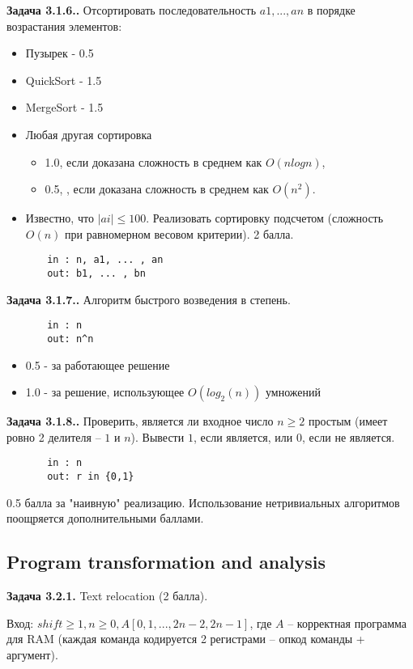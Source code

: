 \documentclass[a4paper, 10pt]{extarticle}
\newcommand{\Task}[1]{\textbf{Задача #1.}}
\begin{document}
\Task{3.1.6.} Отсортировать последовательность $a1, ..., an$ в порядке возрастания элементов:
\begin{itemize}
 \item Пузырек   - 0.5
 \item QuickSort - 1.5
 \item MergeSort - 1.5
 \item Любая другая сортировка 
 \begin{itemize}
  \item 1.0, если доказана сложность в среднем как $O(n log n)$, 
  \item 0.5, , если доказана сложность в среднем как $O(n^2)$. 
 \end{itemize}       
 \item Известно, что $|ai| \leq 100$. Реализовать сортировку подсчетом (сложность $O(n)$ при равномерном весовом критерии). 2 балла.
\end{itemize}
\begin{verbatim}
       in : n, a1, ... , an
       out: b1, ... , bn
\end{verbatim}

\Task{3.1.7.} Алгоритм быстрого возведения в степень.
\begin{verbatim}
       in : n
       out: n^n
\end{verbatim}
\begin{itemize}
  \item  0.5 - за работающее решение
  \item  1.0 - за решение, использующее $O(log_2(n))$ умножений
\end{itemize}
       
\Task{3.1.8.} Проверить, является ли входное число $n \geq 2$ простым (имеет ровно 2 делителя -- $1$ и $n$). 
Вывести $1$, если является, или $0$, если не является.
\begin{verbatim}
       in : n
       out: r in {0,1}
\end{verbatim}
0.5 балла за "наивную" реализацию. Использование нетривиальных алгоритмов поощряется дополнительными баллами.
    
\subsection{Program transformation and analysis}
\Task{3.2.1} Text relocation (2 балла).

Вход: $shift \geq 1, n \geq 0, A[0, 1,  ... , 2n-2, 2n-1]$, где $A$ -- корректная программа для RAM 
(каждая команда кодируется 2 регистрами -- опкод команды + аргумент). 
\end{document}
